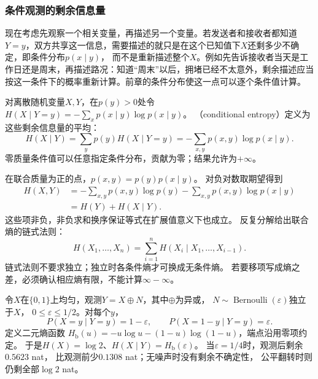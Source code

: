 \subsubsection{条件观测的剩余信息量}
\label{sec:information-remaining-information}

现在考虑先观察一个相关变量，再描述另一个变量。若发送者和接收者都知道\(Y=y\)，双方共享这一信息，需要描述的就只是在这个已知值下\(X\)还剩多少不确定，即条件分布\(p(x\mid y)\)，
而不是重新描述整个\(X\)。例如先告诉接收者当天是工作日还是周末，再描述路况：知道“周末”以后，拥堵已经不太意外，剩余描述应当按这一条件下的概率重新计算。前章的条件分布使这一点可以逐个条件值计算。

\begin{definition}[离散条件熵]
\label{def:information-conditional-entropy}
对离散随机变量\(X,Y\)，在\(p(y)>0\)处令
\(H(X\mid Y=y)=-\sum_xp(x\mid y)\log p(x\mid y)\)。
（conditional entropy）定义为这些剩余信息量的平均：
\begin{equation}
  H(X\mid Y)=\sum_yp(y)H(X\mid Y=y)
           =-\sum_{x,y}p(x,y)\log p(x\mid y).
  \label{eq:information-conditional-entropy}
\end{equation}
零质量条件值可以任意指定条件分布，贡献为零；结果允许为\(+\infty\)。
\end{definition}

在联合质量为正的点，\(p(x,y)=p(y)p(x\mid y)\)。
对负对数取期望得到
\[
\begin{aligned}
  H(X,Y)
  &=-\sum_{x,y}p(x,y)\log p(y)
    -\sum_{x,y}p(x,y)\log p(x\mid y)\\
  &=H(Y)+H(X\mid Y).
\end{aligned}
\]
这些项非负，非负求和换序保证等式在扩展值意义下也成立。
反复分解给出联合熵的链式法则：
\begin{equation}
  H(X_1,\ldots,X_n)
  =\sum_{i=1}^nH(X_i\mid X_1,\ldots,X_{i-1}).
  \label{eq:information-entropy-chain-rule}
\end{equation}
链式法则不要求独立；独立时各条件熵才可换成无条件熵。
若要移项写成熵之差，必须确认相应熵有限，不能计算\(\infty-\infty\)。

\begin{example}[一次带噪二元观测]
\label{ex:information-binary-channel}
令\(X\)在\(\{0,1\}\)上均匀，观测\(Y=X\oplus N\)，其中\(\oplus\)为异或，
\(N\sim\operatorname{Bernoulli}(\varepsilon)\)独立于\(X\)，
\(0\leq\varepsilon\leq1/2\)。对每个\(y\)，
\[
  P(X=y\mid Y=y)=1-\varepsilon,\qquad
  P(X=1-y\mid Y=y)=\varepsilon.
\]
定义二元熵函数
\(H_{\mathrm b}(u)=-u\log u-(1-u)\log(1-u)\)，端点沿用零项约定。
于是\(H(X)=\log2\)、\(H(X\mid Y)=H_{\mathrm b}(\varepsilon)\)。
当\(\varepsilon=1/4\)时，观测后剩余\(0.5623\) nat，
比观测前少\(0.1308\) nat；无噪声时没有剩余不确定性，
公平翻转时则仍剩全部\(\log2\) nat。
\end{example}

